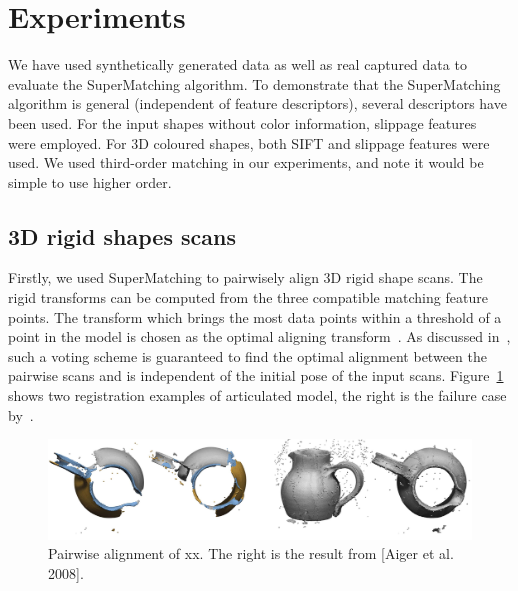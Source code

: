 \section{Experiments}
\label{sec:experiments}

We have used synthetically generated data as well as real captured data to evaluate the SuperMatching algorithm.
To demonstrate that the SuperMatching algorithm is general (independent of feature descriptors), several descriptors have been used.
For the input shapes without color information, slippage features~\cite{Bokeloh08} were employed.
For 3D coloured shapes, both SIFT and slippage features were used.
We used third-order matching in our experiments, and note it would be simple to use higher order.

\subsection{3D rigid shapes scans}
\label{subsec:3DRigid}

Firstly, we used SuperMatching to pairwisely align 3D rigid shape scans.
The rigid transforms can be computed from the three compatible matching feature points.
The transform which brings the most data points within a threshold of a point in the model is chosen as the optimal aligning transform~\cite{Huttenlocher90}.
As discussed in~\cite{Gelfand05}, such a voting scheme is guaranteed to find the optimal alignment between the pairwise scans and is independent of the initial pose of the input scans.
Figure~\ref{fig:3DPair} shows two registration examples of articulated model, the right is the failure case by~\cite{Aiger08}.

\begin{figure}[htb]
\centering
  \includegraphics[width=0.99\linewidth]{figures/rigidCMP.jpg}
  \caption{Pairwise alignment of xx. The right is the result from [Aiger et al. 2008]. }
\label{fig:3DPair}
\end{figure}

